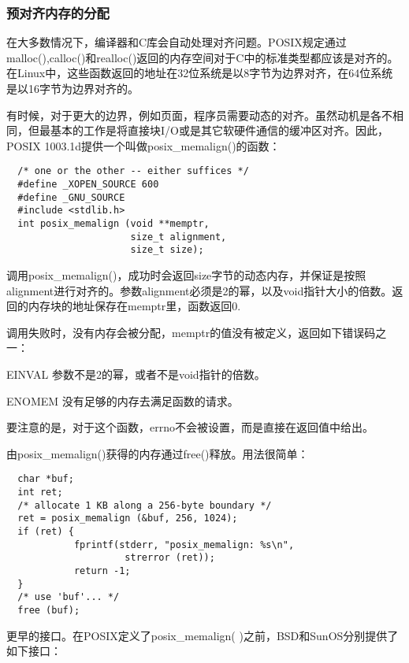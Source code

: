 \subsubsection{预对齐内存的分配}

在大多数情况下，编译器和C库会自动处理对齐问题。POSIX规定通过malloc(),calloc()和realloc()返回的内存空间对于C中的标准类型都应该是对齐的。在Linux中，这些函数返回的地址在32位系统是以8字节为边界对齐，在64位系统是以16字节为边界对齐的。

有时候，对于更大的边界，例如页面，程序员需要动态的对齐。虽然动机是各不相同，但最基本的工作是将直接块I/O或是其它软硬件通信的缓冲区对齐。因此，POSIX 1003.1d提供一个叫做posix\_memalign()的函数： 

\begin{lstlisting}
  /* one or the other -- either suffices */
  #define _XOPEN_SOURCE 600
  #define _GNU_SOURCE
  #include <stdlib.h>
  int posix_memalign (void **memptr,
                      size_t alignment,
                      size_t size);
\end{lstlisting}

调用posix\_memalign()，成功时会返回size字节的动态内存，并保证是按照alignment进行对齐的。参数alignment必须是2的幂，以及void指针大小的倍数。返回的内存块的地址保存在memptr里，函数返回0.

调用失败时，没有内存会被分配，memptr的值没有被定义，返回如下错误码之一： 

\begin{eqlist*}
\item[EINVAL] 参数不是2的幂，或者不是void指针的倍数。 
\item[ENOMEM] 没有足够的内存去满足函数的请求。 
\end{eqlist*}

要注意的是，对于这个函数，errno不会被设置，而是直接在返回值中给出。

由posix\_memalign()获得的内存通过free()释放。用法很简单： 

\begin{lstlisting}
  char *buf;
  int ret;
  /* allocate 1 KB along a 256-byte boundary */
  ret = posix_memalign (&buf, 256, 1024);
  if (ret) {
            fprintf(stderr, "posix_memalign: %s\n",
                     strerror (ret));
            return -1;
  }
  /* use 'buf'... */
  free (buf);
\end{lstlisting}

  更早的接口。在POSIX定义了posix\_memalign( )之前，BSD和SunOS分别提供了如下接口： 

